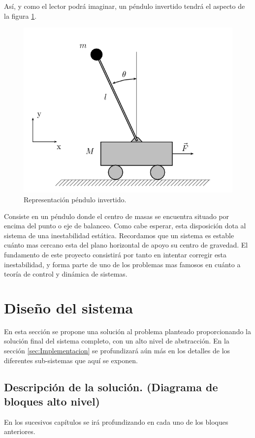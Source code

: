 Así, y como el lector podrá imaginar, un péndulo invertido tendrá el aspecto de la figura \ref{fig:pendulo}. 

\begin{figure}[H]
	\center
	\includegraphics[trim = 0mm 0mm 0mm 0mm, clip,scale=1.6]{imagenes/Balancing_robot/pendulo}
	\caption{Representación péndulo invertido.}
	\label{fig:pendulo}
\end{figure}

Consiste en un péndulo donde el centro de masas se encuentra situado por encima del punto o eje de balanceo. Como cabe esperar, esta disposición dota al sistema de una inestabilidad estática. Recordamos que un sistema es estable cuánto mas cercano esta del plano horizontal de apoyo su centro de gravedad. \newline
El fundamento de este proyecto consistirá por tanto en intentar corregir esta inestabilidad, y forma parte de uno de los problemas mas famosos en cuánto a teoría de control y dinámica de sistemas. 

\newpage
\section{Diseño del sistema}
En esta sección se propone una solución al problema planteado proporcionando la solución final del sistema completo, con un alto nivel de abstracción. En la sección \ref{sec:Implementacion} se profundizará aún más en los detalles de los diferentes sub-sistemas que aquí se exponen.
\subsection{Descripción de la solución. (Diagrama de bloques alto nivel)} \label{sec:descripcion_de_la_solucion}
En los sucesivos capítulos se irá profundizando en cada uno de los bloques anteriores. 
